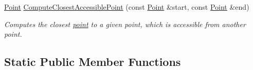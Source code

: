 \begin{DoxyCompactItemize}
\hyperlink{structPathFinder_1_1Point}{Point} \hyperlink{classPathFinder_a1ea7cda7d83a2474efa4af71f0025d94}{ComputeClosestAccessiblePoint} (const \hyperlink{structPathFinder_1_1Point}{Point} \&start, const \hyperlink{structPathFinder_1_1Point}{Point} \&end)
\begin{DoxyCompactList}\small\item\em Computes the closest \hyperlink{structPathFinder_1_1Point}{point} to a given point, which is accessible from another point. \item\end{DoxyCompactList}\end{DoxyCompactItemize}
\subsection*{Static Public Member Functions}
